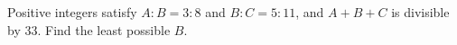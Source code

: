 Positive integers satisfy $ A:B=3:8 $ and $ B:C=5:11 $, and $ A+B+C $ is divisible by 33. Find the least possible $ B $.
